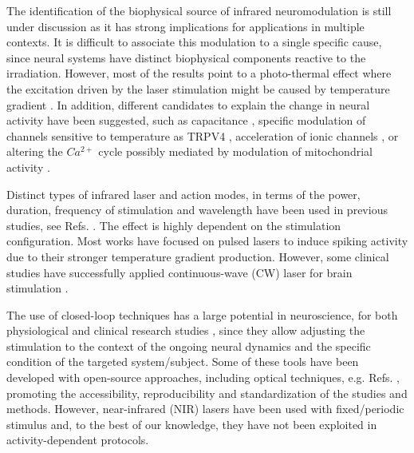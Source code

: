 The identification of the biophysical source of infrared neuromodulation is still under discussion as it has strong implications for applications in multiple contexts. It is difficult to associate this modulation to a single specific cause, since neural systems have distinct biophysical components reactive to the irradiation. However, most of the results point to a photo-thermal effect where the excitation driven by the laser stimulation might be caused by temperature gradient \parencite{wells_biophysical_2007}. In addition, different candidates to explain the change in neural activity have been suggested, such as capacitance \parencite{shapiro_infrared_2012, plaksin_thermal_2018}, specific modulation of channels sensitive to temperature as TRPV4 \parencite{albert_trpv4_2012}, acceleration of ionic channels \parencite{liang_temperature-dependent_2009}, or altering the $Ca^{2+}$ cycle possibly mediated by modulation of mitochondrial activity \parencite{dittami_intracellular_2011, lumbreras_pulsed_2014, saucedo_transcranial_2021}.

Distinct types of infrared laser and action modes, in terms of the power, duration, frequency of stimulation and wavelength have been used in previous studies, see Refs. \cite{izzo_optical_2007, wells_application_2005,ping_targeted_2023}. The effect is highly dependent on the stimulation configuration. Most works have focused on pulsed lasers to induce spiking activity due to their stronger temperature gradient production. However, some clinical studies have successfully applied continuous-wave (CW) laser for brain stimulation \parencite{saucedo_transcranial_2021}.

The use of closed-loop techniques has a large potential in neuroscience, for both physiological and clinical research studies \parencite{potter2010, chamorro_generalization_2012, couto_firing_2015,lareo_temporal_2016,varona_online_2016,zrenner_closed-loop_2016,reyes-sanchez_automatic_2020,reyes-sanchez_automatized_2023}, since they allow adjusting the stimulation to the context of the ongoing neural dynamics and the specific condition of the targeted system/subject. Some of these tools have been developed with open-source approaches, including optical techniques, e.g. Refs. \parencite{siegle_neural_2015,dagnew_cerebralux_2017,amaducci_rthybrid_2019,stih_stytra_2019,robbins_optogenie_2021}, promoting the accessibility, reproducibility and standardization of the studies and methods. However, near-infrared (NIR) lasers have been used with fixed/periodic stimulus and, to the best of our knowledge, they have not been exploited in activity-dependent protocols. 


